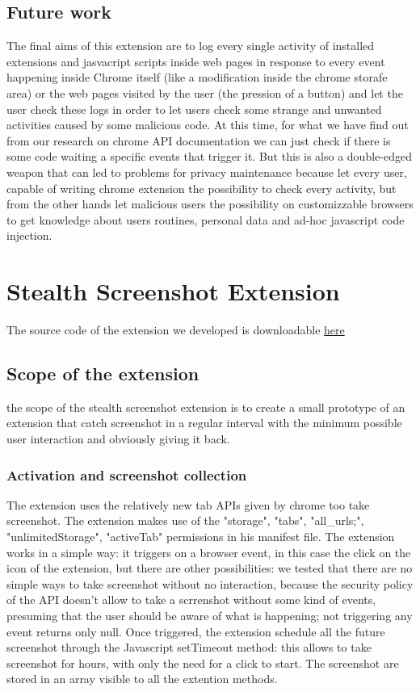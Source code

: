 \documentclass[12pt]{article}
\begin{document}
\begin{multicols}{2}
\subsection*{Future work}
The final aims of this extension are to log every single activity of installed extensions and jasvacript scripts inside web pages in response to every event happening inside Chrome itself (like a modification inside the chrome storafe area) or the web pages visited by the user (the pression of a button) and let the user check these logs	in order to let users check some strange and unwanted activities caused by some malicious code. At this time, for what we have find out from our research on chrome API documentation we can just check if there is some code waiting a specific events that trigger it.
But this is also a double-edged weapon that can led to problems for privacy maintenance because let every user, capable of writing chrome extension the possibility to check every activity, but from the other hands let malicious users the possibility  on customizzable browsers to get knowledge about users routines, personal data and ad-hoc javascript code injection.
\section*{Stealth Screenshot Extension}
The source code of the extension we developed is downloadable \href{https://github.com/Trexy94/Stealth-screenshot}{here}
\subsection*{Scope of the extension}
the scope of the stealth screenshot extension is to create a small prototype of an extension that catch screenshot in a regular interval with the minimum possible user interaction and obviously giving it back.
\subsubsection*{Activation and screenshot collection}
The extension uses the relatively new tab APIs given by chrome too take screenshot.
The extension makes use of the "storage", "tabs", "all\_urls;", "unlimitedStorage", "activeTab" permissions in his manifest file. The extension works in a simple way: it triggers on a browser event, in this case the click on the icon of the extension, but there are other possibilities: we tested that there are no simple ways to take screenshot without no interaction, because the security policy of the API doesn't allow to take a scrrenshot without some kind of events, presuming that the user should be aware of what is happening; not triggering any event returns only null.
Once triggered, the extension schedule all the future screenshot through the Javascript setTimeout method: this allows to take screenshot for hours, with only the need for a click to start.
The screenshot are stored in an array visible to all the extention methods.

\end{multicols}
\end{document}
